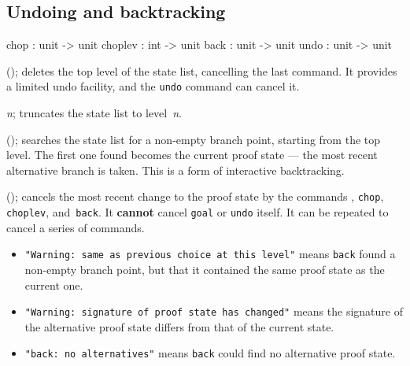 \subsection{Undoing and backtracking}
\begin{ttbox} 
chop    : unit -> unit
choplev : int -> unit
back    : unit -> unit
undo    : unit -> unit
\end{ttbox}
\begin{ttdescription}
\item[\ttindexbold{chop}();] 
deletes the top level of the state list, cancelling the last 
command.  It provides a limited undo facility, and the {\tt undo} command
can cancel it.

\item[\ttindexbold{choplev} {\it n};] 
truncates the state list to level~{\it n}. 

\item[\ttindexbold{back}();]
searches the state list for a non-empty branch point, starting from the top
level.  The first one found becomes the current proof state --- the most
recent alternative branch is taken.  This is a form of interactive
backtracking.

\item[\ttindexbold{undo}();] 
cancels the most recent change to the proof state by the commands ,
{\tt chop}, {\tt choplev}, and~{\tt back}.  It {\bf cannot}
cancel {\tt goal} or {\tt undo} itself.  It can be repeated to
cancel a series of commands.
\end{ttdescription}

\goodbreak
{}\par\nobreak
\begin{itemize}
\item{\footnotesize\tt"Warning:\ same as previous choice at this level"}
  means {\tt back} found a non-empty branch point, but that it contained
  the same proof state as the current one.
\item{\footnotesize\tt "Warning:\ signature of proof state has changed"}
  means the signature of the alternative proof state differs from that of
  the current state.
\item {\footnotesize\tt "back:\ no alternatives"} means {\tt back} could
  find no alternative proof state.
\end{itemize}

